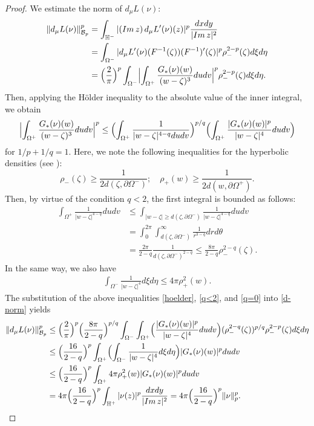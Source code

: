 \documentclass[amstex,12pt,reqno]{amsart}
\theoremstyle{definition}
\begin{document}
\begin{proof}
We estimate the norm of $d_\mu L(\nu)$:
\begin{align}\label{d-norm}
\Vert d_\mu L(\nu) \Vert_{{\mathcal B}_p}^p
&=\int_{\mathbb H^-} |({\rm Im}\,z)\,d_\mu L'(\nu)(z)|^p\frac{dxdy}{|{\rm Im}\,z|^2}\\
&=\int_{\Omega^-} |d_\mu L'(\nu)(F^{-1}(\zeta))(F^{-1})'(\zeta)|^p \rho_-^{2-p}(\zeta) d\xi d\eta \\
&=\Bigl(\frac{2}{\pi}\Bigr)^p\int_{\Omega^-} \Bigl|\int_{\Omega^+} \frac{G_*(\nu)(w)}{(w-\zeta)^3}dudv \Bigr|^p 
\rho_-^{2-p}(\zeta) d\xi d\eta.
\end{align}
Then, applying the H\"older inequality to the absolute value of the inner integral, we obtain
\begin{align}\label{hoelder}
\Bigl|\int_{\Omega^+} \frac{G_*(\nu)(w)}{(w-\zeta)^3}dudv \Bigr|^p
\leq \Bigl(\int_{\Omega^+} \frac{1}{|w-\zeta|^{4-q}dudv}\Bigr)^{p/q}\Bigl(\int_{\Omega^+} \frac{|G_*(\nu)(w)|^p}{|w-\zeta|^4}dudv\Bigr)
\end{align}
for $1/p+1/q=1$.
Here, we note the following inequalities for the hyperbolic densities (see \cite[p.6]{Le}):
$$
\rho_-(\zeta) \geq \frac{1}{2d(\zeta, \partial \Omega^-)};\quad \rho_+(w) \geq \frac{1}{2d(w, \partial \Omega^+)}.
$$
Then, by virtue of the condition $q<2$, the first integral is bounded as follows:
\begin{align}\label{q<2}
\int_{\Omega^+} \frac{1}{|w-\zeta|^{4-q}}dudv 
&\leq \int_{|w-\zeta| \geq d(\zeta,\partial \Omega^-)}\frac{1}{|w-\zeta|^{4-q}}dudv \nonumber\\
&=\int_0^{2\pi}\!\! \int_{d(\zeta,\partial \Omega^-)}^\infty\frac{1}{r^{3-q}}drd\theta \nonumber\\
&=\frac{2\pi}{2-q}\frac{1}{d(\zeta,\partial \Omega^-)^{2-q}} \leq \frac{8\pi}{2-q}\rho_-^{2-q}(\zeta).
\end{align}
In the same way, we also have
\begin{align}\label{q=0}
\int_{\Omega^-} \frac{1}{|w-\zeta|^{4}}d\xi d\eta \leq 4\pi \rho_+^{2}(w).
\end{align}
The substitution of the above inequalities \eqref{hoelder}, \eqref{q<2}, and \eqref{q=0} into \eqref{d-norm} yields
\begin{align}\label{d-estimate}
\Vert d_\mu L(\nu) \Vert_{{\mathcal B}_p}^p
&\leq \Bigl(\frac{2}{\pi}\Bigr)^p \Bigl(\frac{8\pi}{2-q}\Bigr)^{p/q}\int_{\Omega^-} 
\int_{\Omega^+} \Bigl(\frac{|G_*(\nu)(w)|^p}{|w-\zeta|^4}dudv \Bigr) (\rho_-^{2-q}(\zeta))^{p/q} 
\rho_-^{2-p}(\zeta) d\xi d\eta \nonumber\\
&\leq \Bigl(\frac{16}{2-q}\Bigr)^p \int_{\Omega^+} \Bigl(\int_{\Omega^-} \frac{1}{|w-\zeta|^4}d\xi d\eta \Bigr)
|G_*(\nu)(w)|^p dudv \nonumber\\
&\leq \Bigl(\frac{16}{2-q}\Bigr)^p \int_{\Omega^+} 4\pi \rho_+^2(w)|G_*(\nu)(w)|^p dudv \nonumber\\
&=4\pi \Bigl(\frac{16}{2-q}\Bigr)^p \int_{\mathbb H^+} |\nu(z)|^p \frac{dxdy}{|{\rm Im}\,z|^2}=4\pi \Bigl(\frac{16}{2-q}\Bigr)^p \Vert \nu \Vert_p^p.
\end{align}


\end{proof}
\end{document}
